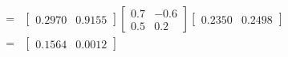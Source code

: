 \documentclass[12pt]{article}
\begin{document}
\begin{enumerate}[font=\Large]
$$\begin{aligned}
			      =         & \begin{bmatrix} 0.2970 & 0.9155 \end{bmatrix}\begin{bmatrix}0.7 & -0.6 \\0.5 & 0.2\end{bmatrix}\begin{bmatrix} 0.2350 & 0.2498 \end{bmatrix}                                                                         \\
			      =         & \begin{bmatrix} 0.1564 & 0.0012 \end{bmatrix}                                                                                                                                                                        \\

\end{aligned}$$
\end{enumerate}
\end{document}
